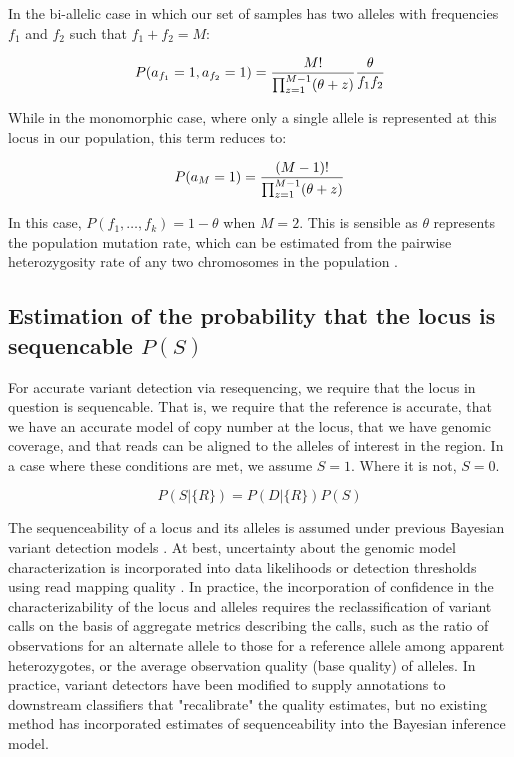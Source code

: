 \documentclass{article}
\begin{document}
In the bi-allelic case in which our set of samples has two alleles with frequencies $f_1$ and $f_2$ such that $f_1 + f_2 = M$:

\begin{equation}
P(a_{f_1} = 1, a_{f_2} = 1) = 
{M! \over \prod_{z=1}^{M-1}(\theta+z)}
{\theta \over f_1 f_2}
\end{equation}

While in the monomorphic case, where only a single allele is represented at this locus in our population, this term reduces to:

\begin{equation}
P(a_M = 1) = 
{(M-1)! \over \prod_{z=1}^{M-1}(\theta+z)}
\end{equation}

In this case, $P(f_1,\ldots,f_k) = 1 - \theta$ when $M = 2$.  This is sensible as $\theta$ represents the population mutation rate, which can be estimated from the pairwise heterozygosity rate of any two chromosomes in the population \citep{watterson1975, tajima1983}.

\subsection{Estimation of the probability that the locus is sequencable $P(S)$}
\label{sec:sequencable}

For accurate variant detection via resequencing, we require that the locus in question is sequencable.  That is, we require that the reference is accurate, that we have an accurate model of copy number at the locus, that we have genomic coverage, and that reads can be aligned to the alleles of interest in the region.  In a case where these conditions are met, we assume $S=1$.  Where it is not, $S=0$.

\begin{equation}
P(S|\{R\}) = P(D|\{R\})P(S)
\end{equation}

The sequenceability of a locus and its alleles is assumed under previous Bayesian variant detection models \citep{marth99, samtools, li2011stats}.  At best, uncertainty about the genomic model characterization is incorporated into data likelihoods or detection thresholds using read mapping quality \citep{snptools, maq}.  In practice, the incorporation of confidence in the characterizability of the locus and alleles requires the reclassification of variant calls on the basis of aggregate metrics describing the calls, such as the ratio of observations for an alternate allele to those for a reference allele among apparent heterozygotes, or the average observation quality (base quality) of alleles.  In practice, variant detectors have been modified to supply annotations to downstream classifiers that "recalibrate" the quality estimates, but no existing method has incorporated estimates of sequenceability into the Bayesian inference model.
\end{document}
